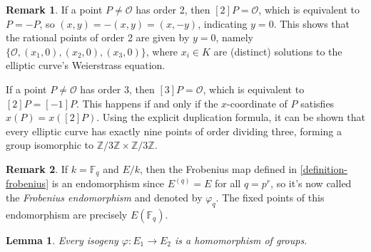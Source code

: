 \documentclass[12pt]{article}
\newtheorem{lemma}{Lemma}[subsection]
\theoremstyle{remark}
\theoremstyle{definition}
\newtheorem{remark}{Remark}[subsection]
\newtheorem{example}{Example}[subsection]
\newcommand{\Z}[0]{\mathbb{Z}}
\newcommand{\F}[0]{\mathbb{F}}
\newcommand{\comment}[1]{}
\begin{document}
        \begin{remark}
            If a point $P\neq\mathcal{O}$ has order 2, then $[2]P=\mathcal{O}$, which is equivalent to $P=-P$, so $(x,y)=-(x,y)=(x,-y)$, indicating $y=0$. This shows that the rational points of order 2 are given by $y=0$, namely $\{\mathcal{O},(x_1,0),(x_2,0),(x_3,0)\}$, where $x_i\in K$ are (distinct) solutions to the elliptic curve's Weierstrass equation.
             
            If a point $P\neq\mathcal{O}$ has order 3, then $[3]P=\mathcal{O}$, which is equivalent to $[2]P=[-1]P$. This happens if and only if the $x$-coordinate of $P$ satisfies $x(P)=x([2]P)$. Using the explicit duplication formula, it can be shown that every elliptic curve has exactly nine points of order dividing three, forming a group isomorphic to $\Z/3\Z\times\Z/3\Z$.
        \end{remark}
        \begin{remark}
            If $k=\F_q$ and $E/k$, then the Frobenius map defined in \autoref{definition-frobenius} is an endomorphism since $E^{(q)}=E$ for all $q=p^r$, so it's now called the \textit{Frobenius endomorphism} and denoted by $\varphi_q$. The fixed points of this endomorphism are precisely $E(\F_q)$.
        \end{remark}
        \comment{
        \begin{example}
            It might be interesting to present a ``visualization" of the Frobenius endomorphism on some cubic over finite fields. Take $k=\F_2$ and $K=\overline{\F_2}$ (all finite fields are perfect). We consider the subgroup $E(\F_{64})$. Note that we have intermediate fields with the following relation:
            \[\begin{tikzcd}
                                      & \mathbb F_{64} \arrow[ld, no head] \arrow[rd, no head] &                                 \\
    \mathbb F_{8} \arrow[rd, no head] &                                                        & \mathbb F_4 \arrow[ld, no head] \\
                                      & \mathbb F_2                                            &                                
    \end{tikzcd}\]
        \end{example}}
        \begin{lemma}\label{lemma-iso-hom}
            Every isogeny $\varphi:E_1\to E_2$ is a homomorphism of groups.
        \end{lemma}
\end{document}

